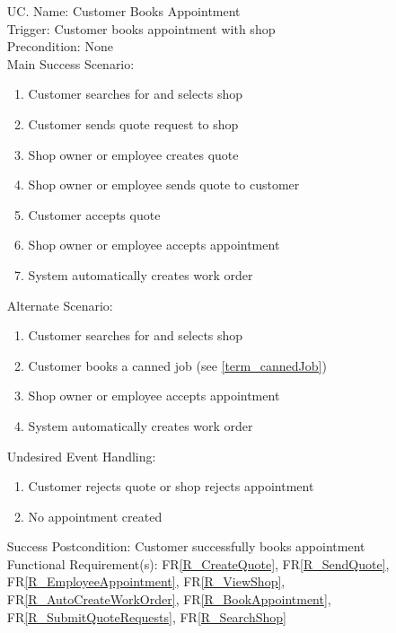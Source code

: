 \documentclass[12pt]{article}
\newcounter{ucnum} %
\begin{document}
\begin{itemize}
\item[UC\refstepcounter{ucnum}\theucnum \label{UC_CustomerBooksAppointment}. ]
Name: Customer Books Appointment\\
Trigger: Customer books appointment with shop\\
Precondition: None\\
Main Success Scenario:
\begin{enumerate}
    \item Customer searches for and selects shop
    \item Customer sends quote request to shop
    \item Shop owner or employee creates quote
    \item Shop owner or employee sends quote to customer
    \item Customer accepts quote
    \item Shop owner or employee accepts appointment
    \item System automatically creates work order
\end{enumerate}
Alternate Scenario:
\begin{enumerate}
    \item Customer searches for and selects shop
    \item Customer books a canned job (see \ref{term_cannedJob})
    \item Shop owner or employee accepts appointment
    \item System automatically creates work order
\end{enumerate}
Undesired Event Handling:
\begin{enumerate}
    \item Customer rejects quote or shop rejects appointment
    \item No appointment created
\end{enumerate}
Success Postcondition: Customer successfully books appointment\\
Functional Requirement(s): FR\ref{R_CreateQuote}, FR\ref{R_SendQuote}, FR\ref{R_EmployeeAppointment}, FR\ref{R_ViewShop}, FR\ref{R_AutoCreateWorkOrder}, FR\ref{R_BookAppointment}, FR\ref{R_SubmitQuoteRequests}, FR\ref{R_SearchShop}


\end{itemize}
\end{document}
